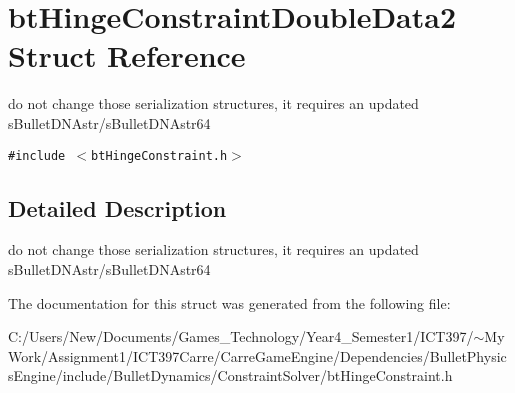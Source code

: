 \hypertarget{structbt_hinge_constraint_double_data2}{
\section{btHingeConstraintDoubleData2 Struct Reference}
\label{structbt_hinge_constraint_double_data2}
}
do not change those serialization structures, it requires an updated sBulletDNAstr/sBulletDNAstr64  


{\tt \#include $<$btHingeConstraint.h$>$}



\subsection{Detailed Description}
do not change those serialization structures, it requires an updated sBulletDNAstr/sBulletDNAstr64 

The documentation for this struct was generated from the following file:\begin{CompactItemize}
\item 
C:/Users/New/Documents/Games\_\-Technology/Year4\_\-Semester1/ICT397/$\sim$My Work/Assignment1/ICT397Carre/CarreGameEngine/Dependencies/BulletPhysicsEngine/include/BulletDynamics/ConstraintSolver/btHingeConstraint.h\end{CompactItemize}
